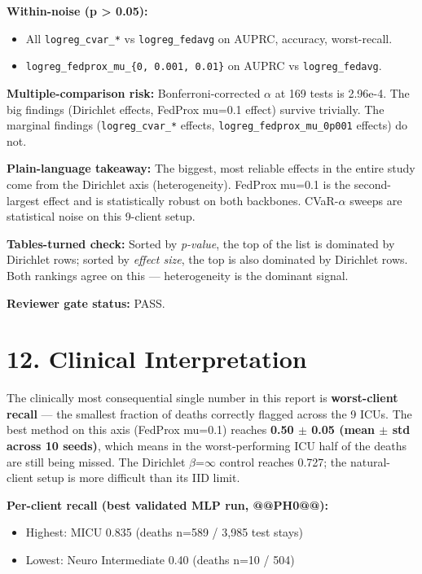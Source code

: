 \documentclass{article}
\begin{document}
\textbf{Within-noise (p > 0.05):}

\begin{itemize}[leftmargin=1.4em,itemsep=2pt,topsep=2pt]
  \item All \texttt{logreg\_cvar\_*} vs \texttt{logreg\_fedavg} on AUPRC, accuracy, worst-recall.
  \item \texttt{logreg\_fedprox\_mu\_\{0, 0.001, 0.01\}} on AUPRC vs \texttt{logreg\_fedavg}.
\end{itemize}


\textbf{Multiple-comparison risk:} Bonferroni-corrected \ensuremath{\alpha} at 169 tests is 2.96e-4. The big findings (Dirichlet effects, FedProx mu=0.1 effect) survive trivially. The marginal findings (\texttt{logreg\_cvar\_*} effects, \texttt{logreg\_fedprox\_mu\_0p001} effects) do not.


\textbf{Plain-language takeaway:} The biggest, most reliable effects in the entire study come from the Dirichlet axis (heterogeneity). FedProx mu=0.1 is the second-largest effect and is statistically robust on both backbones. CVaR-\ensuremath{\alpha} sweeps are statistical noise on this 9-client setup.


\textbf{Tables-turned check:} Sorted by \emph{p-value}, the top of the list is dominated by Dirichlet rows; sorted by \emph{effect size}, the top is also dominated by Dirichlet rows. Both rankings agree on this --- heterogeneity is the dominant signal.


\textbf{Reviewer gate status:} PASS.



\clearpage
\section{12. Clinical Interpretation}


The clinically most consequential single number in this report is \textbf{worst-client recall} --- the smallest fraction of deaths correctly flagged across the 9 ICUs. The best method on this axis (FedProx mu=0.1) reaches \textbf{0.50 \ensuremath{\pm} 0.05 (mean \ensuremath{\pm} std across 10 seeds)}, which means in the worst-performing ICU half of the deaths are still being missed. The Dirichlet \ensuremath{\beta}=\ensuremath{\infty} control reaches 0.727; the natural-client setup is more difficult than its IID limit.


\textbf{Per-client recall (best validated MLP run, @@PH0@@):}

\begin{itemize}[leftmargin=1.4em,itemsep=2pt,topsep=2pt]
  \item Highest: MICU 0.835 (deaths n=589 / 3,985 test stays)
  \item Lowest: Neuro Intermediate 0.40 (deaths n=10 / 504)
\end{itemize}
\end{document}
